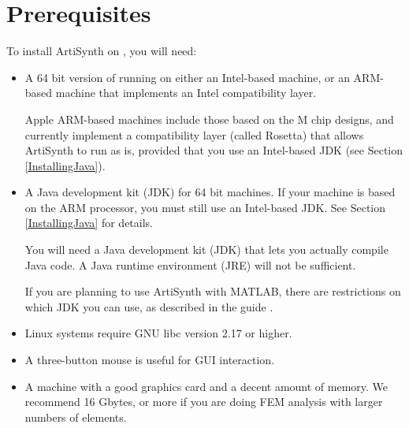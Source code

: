 \section{Prerequisites}
\label{Prerequisites}

To install ArtiSynth on \SYSTEM{}, you will need:

\begin{itemize}

\item A 64 bit version of \SYSTEM{} running on either an Intel-based
machine, or an ARM-based machine that implements an Intel
compatibility layer.

\ifMacOS
\begin{sideblock}
Apple ARM-based machines include those based on the M chip
designs, and currently implement a compatibility layer (called
Rosetta) that allows ArtiSynth to run as is, provided that you use an
Intel-based JDK (see Section \ref{InstallingJava}).
\end{sideblock}
\fi

\item A Java development kit (JDK) for 64 bit machines. 
If your machine is based on the ARM processor, you must still use an
Intel-based JDK.  See Section
\ref{InstallingJava} for details.

\begin{sideblock}
You will need a Java development kit (JDK) that lets you actually compile Java
code. A Java runtime environment (JRE) will not be sufficient.
\end{sideblock}

\begin{sideblock}
If you are planning to use ArtiSynth with MATLAB, there are restrictions on
which JDK you can use, as described in the guide
.
\end{sideblock}

\ifLinux
\item Linux systems require GNU libc version 2.17 or higher.
\fi

\item A three-button mouse is useful for GUI interaction.

\item A machine with a good graphics card and a decent amount of
memory. We recommend 16 Gbytes, or more if you are doing FEM analysis
with larger numbers of elements.

\end{itemize}

